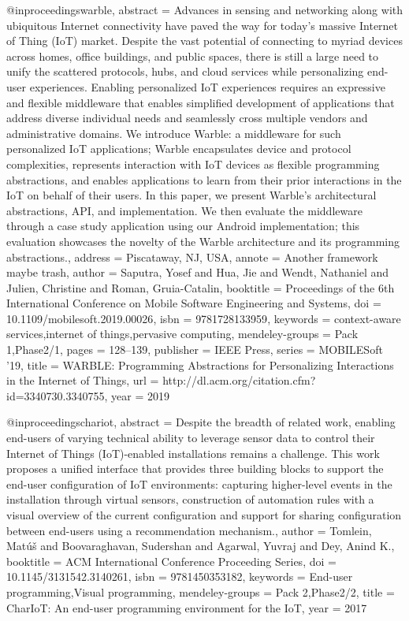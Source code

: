 @inproceedings{warble,
    abstract = {Advances in sensing and networking along with ubiquitous Internet connectivity have paved the way for today's massive Internet of Thing (IoT) market. Despite the vast potential of connecting to myriad devices across homes, office buildings, and public spaces, there is still a large need to unify the scattered protocols, hubs, and cloud services while personalizing end-user experiences. Enabling personalized IoT experiences requires an expressive and flexible middleware that enables simplified development of applications that address diverse individual needs and seamlessly cross multiple vendors and administrative domains. We introduce Warble: a middleware for such personalized IoT applications; Warble encapsulates device and protocol complexities, represents interaction with IoT devices as flexible programming abstractions, and enables applications to learn from their prior interactions in the IoT on behalf of their users. In this paper, we present Warble's architectural abstractions, API, and implementation. We then evaluate the middleware through a case study application using our Android implementation; this evaluation showcases the novelty of the Warble architecture and its programming abstractions.},
    address = {Piscataway, NJ, USA},
    annote = {Another framework maybe trash},
    author = {Saputra, Yosef and Hua, Jie and Wendt, Nathaniel and Julien, Christine and Roman, Gruia-Catalin},
    booktitle = {Proceedings of the 6th International Conference on Mobile Software Engineering and Systems},
    doi = {10.1109/mobilesoft.2019.00026},
    isbn = {9781728133959},
    keywords = {context-aware services,internet of things,pervasive computing},
    mendeley-groups = {Pack 1,Phase2/1},
    pages = {128--139},
    publisher = {IEEE Press},
    series = {MOBILESoft '19},
    title = {{WARBLE: Programming Abstractions for Personalizing Interactions in the Internet of Things}},
    url = {http://dl.acm.org/citation.cfm?id=3340730.3340755},
    year = {2019}
}

@inproceedings{chariot,
    abstract = {Despite the breadth of related work, enabling end-users of varying technical ability to leverage sensor data to control their Internet of Things (IoT)-enabled installations remains a challenge. This work proposes a unified interface that provides three building blocks to support the end-user configuration of IoT environments: capturing higher-level events in the installation through virtual sensors, construction of automation rules with a visual overview of the current configuration and support for sharing configuration between end-users using a recommendation mechanism.},
    author = {Tomlein, Mat{\'{u}}{\v{s}} and Boovaraghavan, Sudershan and Agarwal, Yuvraj and Dey, Anind K.},
    booktitle = {ACM International Conference Proceeding Series},
    doi = {10.1145/3131542.3140261},
    isbn = {9781450353182},
    keywords = {End-user programming,Visual programming},
    mendeley-groups = {Pack 2,Phase2/2},
    title = {{CharIoT: An end-user programming environment for the IoT}},
    year = {2017}
}

